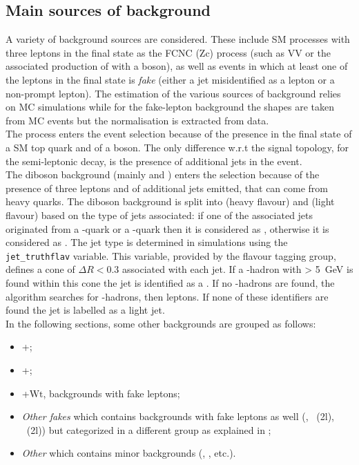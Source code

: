 \subsection{Main sources of background}
\label{sec:background}
A variety of background sources are considered.
These include SM processes with three leptons in the final state as the FCNC \ttbar (Zc)
process (such as VV or the associated production of \ttbar with
a \PZ boson), as well as events in which at least one of the leptons
in the final state is \textit{fake} (either a jet misidentified as a
lepton or a non-prompt lepton).
The estimation of the various sources of background relies on MC
simulations while for the
\ttbar fake-lepton background the shapes are taken from MC events but the
normalisation is extracted from data. \\
The \ttZ process enters the event selection because of the presence in the
final state of a SM top quark and of a \PZ boson. The only difference
w.r.t the signal topology, for the semi-leptonic \ttbar decay, is the
presence of additional jets in the event. \\
The diboson background (mainly \PW\PZ and \PZ\PZ) enters the selection because of the presence
of three leptons and of additional jets emitted, that can come from heavy
quarks. 
The diboson background is split into \VVHF (heavy flavour) and \VVLF (light flavour) based on the type of jets associated:
if one of the associated jets originated from a \Pqb-quark or a \Pqc-quark then it is considered as \VVHF, otherwise it is considered as \VVLF. %
The jet type is determined in simulations using the \texttt{jet\_truthflav} variable.
This variable, provided by the flavour tagging group, defines a cone of $\Delta R < 0.3$ associated with each jet.
If a \Pqb-hadron with \pT > \SI{5}{\GeV} is found within this cone the jet is identified as a \bjet.
If no \Pqb-hadrons are found, the algorithm searches for \Pqc-hadrons, then \Pgt leptons.
If none of these identifiers are found the jet is labelled as a light jet.\\
In the following sections, some other backgrounds are grouped as follows:
\begin{itemize}
	\item \ttZ+\tWZ;
	\item \ttW+\ttH;
	\item \ttbar+$\mathrm{Wt}$, backgrounds with fake leptons;
	\item \textit{Other fakes} which contains backgrounds with fake leptons as well (\Zjets, \VV~(2l), \ttZ~(2l)) but categorized in a different group as explained in ;
	\item \textit{Other} which contains minor backgrounds (\ttt, \VVV,  \ttWW etc.).
\end {itemize}

